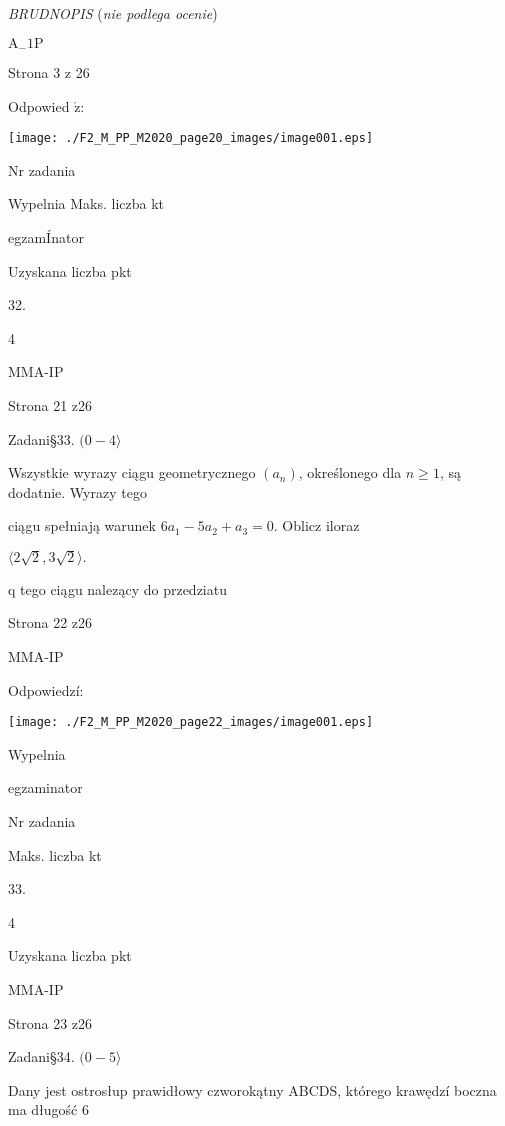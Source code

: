 \documentclass[a4paper,12pt]{article}
\begin{document}
{\it BRUDNOPIS} ({\it nie podlega ocenie})

$\mathrm{A}_{-}1\mathrm{P}$

Strona 3 z 26





Odpowied $\acute{\mathrm{z}}$:
\begin{center}
\texttt{[image: ./F2\_M\_PP\_M2020\_page20\_images/image001.eps]}
\end{center}
Nr zadania

Wypelnia Maks. liczba kt

egzamÍnator

Uzyskana liczba pkt

32.

4

MMA-IP

Strona 21 z26





Zadani\S 33. $(0-4\rangle$

Wszystkie wyrazy ciągu geometrycznego $(a_{n})$, określonego dla $n\geq 1$, są dodatnie. Wyrazy tego

ciągu spełniają warunek $6a_{1}-5a_{2}+a_{3}=0$. Oblicz iloraz

$\langle 2\sqrt{2}, 3\sqrt{2}\rangle.$

q tego ciągu nalezący do przedziatu

Strona 22 z26

MMA-IP





Odpowiedzí:
\begin{center}
\texttt{[image: ./F2\_M\_PP\_M2020\_page22\_images/image001.eps]}
\end{center}
Wypelnia

egzaminator

Nr zadania

Maks. liczba kt

33.

4

Uzyskana liczba pkt

MMA-IP

Strona 23 z26





Zadani\S 34. $(0-5\rangle$

Dany jest ostrosłup prawidłowy czworokątny ABCDS, którego krawędzí boczna ma długość 6
\end{document}
